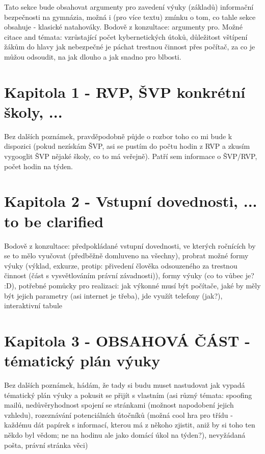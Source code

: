\documentclass[a4paper, 11pt]{article}
\begin{document}
Tato sekce bude obsahovat argumenty pro zavedení výuky (základů) informační bezpečnosti na gymnázia, možná i (pro více textu) zmínku o tom, co tahle sekce obsahuje - klasické natahováky.
Bodově z konzultace: argumenty pro. 
Možné citace and témata: vzrůstající počet kybernetických útoků, důležitost vštípení žákům do hlavy jak nebezpečné je páchat trestnou činnost přes počítač, za co je můžou odsoudit, na jak dlouho a jak snadno pro blbosti.

\section{Kapitola 1 - RVP, ŠVP konkrétní školy, ...}
Bez dalších poznámek, pravděpodobně půjde o rozbor toho co mi bude k dispozici (pokud nezískám ŠVP, asi se pustím do počtu hodin z RVP a zkusím vygooglit ŠVP nějaké školy, co to má veřejně). Patří sem informace o ŠVP/RVP, počet hodin na týden.

\section{Kapitola 2 - Vstupní dovednosti, ... to be clarified}
Bodově z konzultace: předpokládané vstupní dovednosti, ve kterých ročnících by se to mělo vyučovat (předběžně domluveno na všechny), probrat možné formy výuky (výklad, exkurze, protip: přivedení člověka odsouzeného za trestnou činnost (část s vysvětlováním právní závadnosti)), formy výuky (co to vůbec je? :D), potřebné pomůcky pro realizaci: jak výkonné musí být počítače, jaké by měly být jejich parametry (asi internet je třeba), jde využít telefony (jak?), interaktivní tabule


\section{Kapitola 3 - OBSAHOVÁ ČÁST - tématický plán výuky}
Bez dalších poznámek, hádám, že tady si budu muset nastudovat jak vypadá tématický plán výuky a pokusit se přijít s vlastním (asi různý témata: spoofing mailů, nedůvěryhodnost spojení se stránkami (možnost napodobení jejich vzhledu), rozeznávání potenciálních útočníků (možná cool hra pro třídu - každému dát papírek s informací, kterou má z někoho zjistit, aniž by si toho ten někdo byl vědom; ne na hodinu ale jako domácí úkol na týden?), nevyžádaná pošta, právní stránka věci)
\end{document}
